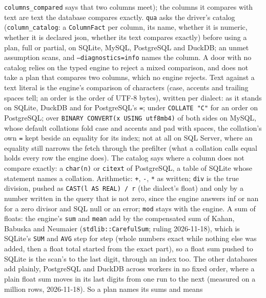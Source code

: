 \documentclass{report}
\begin{document}
\begin{enumerate}
    \texttt{columns\_compared} says that two columns meet); the
    columns it compares with text are text the database compares
    exactly. \texttt{qua} asks the driver's catalog
    (\texttt{column\_catalog}: a \texttt{ColumnFact} per column,
    its name, whether it is numeric, whether it is declared json,
    whether its text compares exactly) before using a plan, full or
    partial, on SQLite, MySQL, PostgreSQL and DuckDB; an unmet
    assumption scans, and \texttt{--diagnostics=info} names the
    column. A door with no catalog relies on the typed engine to
    reject a mixed comparison, and does not take a plan that
    compares two columns, which no engine rejects.
    Text against a text literal is the engine's comparison of
    characters (case, accents and trailing spaces tell; an order is
    the order of UTF-8 bytes), written per dialect: as it stands on
    SQLite, DuckDB and for PostgreSQL's \texttt{=}; under
    \texttt{COLLATE "C"} for an order on PostgreSQL; over
    \texttt{BINARY CONVERT(x USING utf8mb4)} of both sides on
    MySQL, whose default collations fold case and accents and pad
    with spaces, the collation's own \texttt{=} kept beside an
    equality for its index; not at all on SQL Server, where an
    equality still narrows the fetch through the prefilter (what a
    collation calls equal holds every row the engine does). The
    catalog says where a column does not compare exactly: a
    \texttt{char(n)} or \texttt{citext} of PostgreSQL, a table of
    SQLite whose statement names a collation.
    Arithmetic: \texttt{+}, \texttt{-}, \texttt{*} as written;
    \texttt{div} is the true division, pushed as
    \texttt{CAST(l AS REAL) / r} (the dialect's float) and only by
    a number written in the query that is not zero, since the
    engine answers inf or nan for a zero divisor and SQL null or an
    error; \texttt{mod} stays with the engine.
    A sum of floats: the engine's \texttt{sum} and \texttt{mean}
    add by the compensated sum of Kahan, Babuska and Neumaier
    (\texttt{stdlib::CarefulSum}; ruling 2026-11-18), which is
    SQLite's \texttt{SUM} and \texttt{AVG} step for step (whole
    numbers exact while nothing else was added, then a float total
    started from the exact part), so a float sum pushed to SQLite
    is the scan's to the last digit, through an index too. The
    other databases add plainly, PostgreSQL and DuckDB across
    workers in no fixed order, where a plain float sum moves in
    its last digits from one run to the next (measured on a
    million rows, 2026-11-18). So a plan names its sums and means

\end{enumerate}
\end{document}
